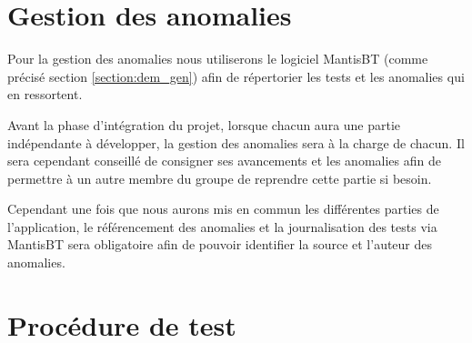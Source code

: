 \chapter{Gestion des anomalies}
Pour la gestion des anomalies nous utiliserons le logiciel MantisBT (comme précisé section
\ref{section:dem_gen}) afin de répertorier les tests et les anomalies qui en ressortent.\newline

Avant la phase d'intégration du projet, lorsque chacun aura une partie indépendante à développer,
la gestion des anomalies sera à la charge de chacun. Il sera cependant conseillé de consigner ses
avancements et les anomalies afin de permettre à un autre membre du groupe de reprendre cette
partie si besoin.\newline

Cependant une fois que nous aurons mis en commun les différentes parties de l'application, le
référencement des anomalies et la journalisation des tests via MantisBT sera obligatoire afin de
pouvoir identifier la source et l'auteur des anomalies.


\chapter{Procédure de test}

